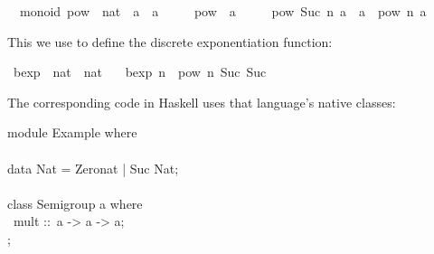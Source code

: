 \begin{isabellebody}
%
\isadelimquote
%
\endisadelimquote
%
\isatagquote
{}\isamarkupfalse%
\ {\isacharparenleft}\ monoid{\isacharparenright}\ pow\ {\isacharcolon}{\isacharcolon}\ {\isachardoublequoteopen}nat\ {\isasymRightarrow}\ {\isacharprime}a\ {\isasymRightarrow}\ {\isacharprime}a{\isachardoublequoteclose}\ \isanewline
\ \ \ \ {\isachardoublequoteopen}pow\ {}\ a\ {\isacharequal}\ {\isasymone}{\isachardoublequoteclose}\isanewline
\ \ {\isacharbar}\ {\isachardoublequoteopen}pow\ {\isacharparenleft}Suc\ n{\isacharparenright}\ a\ {\isacharequal}\ a\ {\isasymotimes}\ pow\ n\ a{\isachardoublequoteclose}%
\endisatagquote
{\isafoldquote}%
%
\isadelimquote
%
\endisadelimquote
%
\begin{isamarkuptext}%
\noindent This we use to define the discrete exponentiation function:%
\end{isamarkuptext}%
\isamarkuptrue%
%
\isadelimquote
%
\endisadelimquote
%
\isatagquote
{}\isamarkupfalse%
\ bexp\ {\isacharcolon}{\isacharcolon}\ {\isachardoublequoteopen}nat\ {\isasymRightarrow}\ nat{\isachardoublequoteclose}\ \isanewline
\ \ {\isachardoublequoteopen}bexp\ n\ {\isacharequal}\ pow\ n\ {\isacharparenleft}Suc\ {\isacharparenleft}Suc\ {}{\isacharparenright}{\isacharparenright}{\isachardoublequoteclose}%
\endisatagquote
{\isafoldquote}%
%
\isadelimquote
%
\endisadelimquote
%
\begin{isamarkuptext}%
\noindent The corresponding code in Haskell uses that language's native classes:%
\end{isamarkuptext}%
\isamarkuptrue%
%
\isadelimquote
%
\endisadelimquote
%
\isatagquote
%
\begin{isamarkuptext}%
\isatypewriter%
\noindent%
\hspace*{0pt}module Example where {}\\
\hspace*{0pt}\\
\hspace*{0pt}data Nat = Zero{}nat | Suc Nat;\\
\hspace*{0pt}\\
\hspace*{0pt}class Semigroup a where {}\\
\hspace*{0pt} ~mult ::~a -> a -> a;\\
\hspace*{0pt}{\char125};\\

\end{isamarkuptext}
\end{isabellebody}
